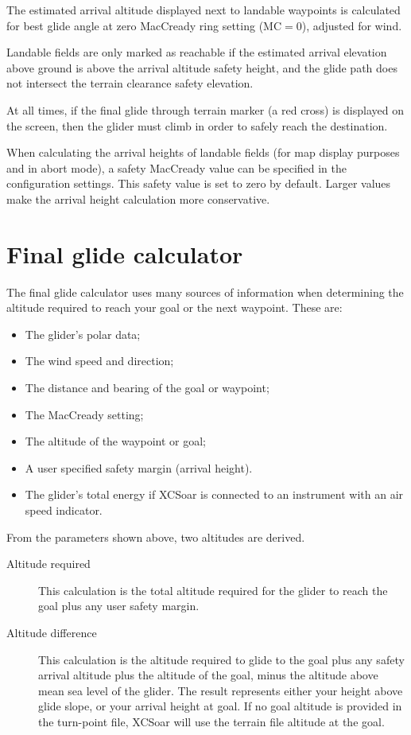 \documentclass[a4paper,12pt]{refrep}
\begin{document}
The estimated arrival altitude displayed next to landable waypoints is
calculated for best glide angle at zero MacCready ring setting
(MC$=0$), adjusted for wind.

Landable fields are only marked as reachable if the estimated arrival
elevation above ground is above the arrival altitude safety height,
and the glide path does not intersect the terrain clearance safety
elevation.

At all times, if the final glide through terrain marker (a red
cross) is displayed on the screen, then the glider must climb in order
to safely reach the destination.

When calculating the arrival heights of landable fields (for map
display purposes and in abort mode), a safety MacCready value can be
specified in the configuration settings.  This safety value is set to
zero by default.  Larger values make the arrival height calculation
more conservative.

\section{Final glide calculator}

The final glide calculator uses many sources of information when
determining the altitude required to reach your goal or the next
waypoint. These are:

\begin{itemize}
\item The glider's polar data;
\item The wind speed and direction;
\item The distance and bearing of the goal or waypoint;
\item The MacCready setting;
\item The altitude of the waypoint or goal;
\item A user specified safety margin (arrival height).
\item The glider's total energy if XCSoar is connected to
  an instrument with an air speed indicator.
\end{itemize}

From the parameters shown above, two altitudes are derived.
\begin{description}
\item[Altitude required]
This calculation is the total altitude required for the glider to
reach the goal plus any user safety margin. 
\item[Altitude difference]
This calculation is the altitude required to glide to the goal plus
any safety arrival altitude plus the altitude of the goal, minus the
altitude above mean sea level of the glider.  The result represents
either your height above glide slope, or your arrival height at goal.
If no goal altitude is provided in the turn-point file, XCSoar will use
the terrain file altitude at the goal.
\end{description}
\end{document}
